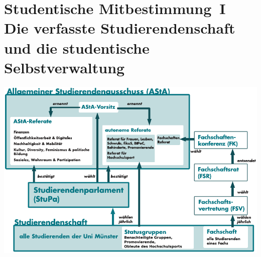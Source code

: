 \section[Studentische Mitbestimmung]{Studentische Mitbestimmung~I\\Die verfasste Studierendenschaft und die studentische Selbstverwaltung}
\label{studmit}

\begin{center}
    \includegraphics[width=.83\textwidth]{res/verfasste_studierendenschaft_neu.pdf}
\end{center}

